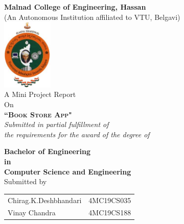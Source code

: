 \begin{titlepage}

\begin{center}
\thispagestyle{empty}
\thisfancypage{%
  \setlength{\fboxsep}{10pt}\doublebox}{}
	
\onehalfspacing
\LARGE{\textbf{Malnad College of Engineering, Hassan}} \\
\large{
(An Autonomous Institution affiliated to VTU, Belgavi)}\\[0.2in]
\vspace{0.3cm}
\includegraphics[width=0.18\textwidth]{./vtu_logo.jpg}\\[0.3in]

\Large{\small{A Mini Project Report \\ On}}\\
\Large{\textsc {\textbf{``Book Store App"}}}\\[0.3cm]
\small \emph{Submitted in partial fulfillment of\\
        the requirements for the award of the degree of}
        \vspace{.2in}

       {\bf Bachelor of Engineering \\in\\ Computer Science and Engineering}\\[0.25cm]
\vspace{1cm}					
\normalsize Submitted by \\
\begin{table}[h]
\centering
\begin{tabular}{lr}
Chirag.K.Deshbhandari & 4MC19CS035 \\
Vinay Chandra & 4MC19CS188 \\ 
\end{tabular}
\end{table}


\end{center}
\end{titlepage}
